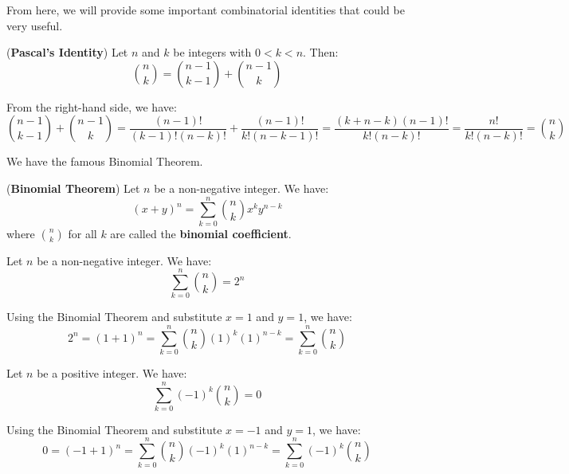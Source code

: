 \documentclass{huhtakm-template-book}
\begin{document}
\newpage
From here, we will provide some important combinatorial identities that could be very useful.
\begin{thm}(\textbf{Pascal's Identity})
	Let $n$ and $k$ be integers with $0<k<n$. Then:
	\begin{equation*}
		\binom{n}{k}=\binom{n-1}{k-1}+\binom{n-1}{k}
	\end{equation*}
\end{thm}
\begin{proofing}
	From the right-hand side, we have:
	\begin{equation*}
		\binom{n-1}{k-1}+\binom{n-1}{k}=\frac{(n-1)!}{(k-1)!(n-k)!}+\frac{(n-1)!}{k!(n-k-1)!}=\frac{(k+n-k)(n-1)!}{k!(n-k)!}=\frac{n!}{k!(n-k)!}=\binom{n}{k}
	\end{equation*}
\end{proofing}
We have the famous Binomial Theorem.
\begin{thm}(\textbf{Binomial Theorem})
	Let $n$ be a non-negative integer. We have:
	\begin{equation*}
		(x+y)^{n}=\sum_{k=0}^{n}\binom{n}{k}x^{k}y^{n-k}
	\end{equation*} 
	where $\binom{n}{k}$ for all $k$ are called the \textbf{binomial coefficient}.
\end{thm}
\begin{cor}
	Let $n$ be a non-negative integer. We have:
	\begin{equation*}
		\sum_{k=0}^{n}\binom{n}{k}=2^{n}
	\end{equation*}
\end{cor}
\begin{proofing}
	Using the Binomial Theorem and substitute $x=1$ and $y=1$, we have:
	\begin{equation*}
		2^{n}=(1+1)^{n}=\sum_{k=0}^{n}\binom{n}{k}(1)^{k}(1)^{n-k}=\sum_{k=0}^{n}\binom{n}{k}
	\end{equation*}
\end{proofing}
\begin{cor}
	Let $n$ be a positive integer. We have:
	\begin{equation*}
		\sum_{k=0}^{n}(-1)^{k}\binom{n}{k}=0
	\end{equation*}
\end{cor}
\begin{proofing}
	Using the Binomial Theorem and substitute $x=-1$ and $y=1$, we have:
	\begin{equation*}
		0=(-1+1)^{n}=\sum_{k=0}^{n}\binom{n}{k}(-1)^{k}(1)^{n-k}=\sum_{k=0}^{n}(-1)^{k}\binom{n}{k}
	\end{equation*}
\end{proofing}
\end{document}
